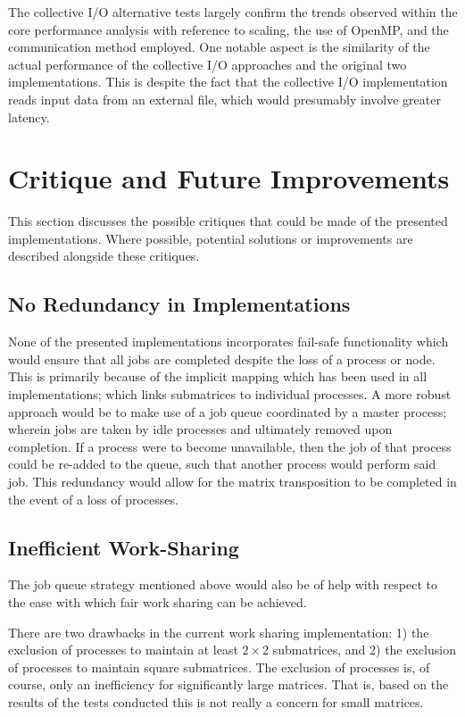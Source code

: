 \documentclass[journal,10pt,a4paper]{IEEEtran}
\begin{document}
The collective I/O alternative tests largely confirm the trends observed within the core performance analysis with reference to scaling, the use of OpenMP, and the communication method employed. One notable aspect is the similarity of the actual performance of the collective I/O approaches and the original two implementations. This is despite the fact that the collective I/O implementation reads input data from an external file, which would presumably involve greater latency.



\section{Critique and Future Improvements}
This section discusses the possible critiques that could be made of the presented implementations. Where possible, potential solutions or improvements are described alongside these critiques.

\subsection{No Redundancy in Implementations}

None of the presented implementations incorporates fail-safe functionality which would ensure that all jobs are completed despite the loss of a process or node. This is primarily because of the implicit mapping which has been used in all implementations; which links submatrices to individual processes. A more robust approach would be to make use of a job queue coordinated by a master process; wherein jobs are taken by idle processes and ultimately removed upon completion. If a process were to become unavailable, then the job of that process could be re-added to the queue, such that another process would perform said job. This redundancy would allow for the matrix transposition to be completed in the event of a loss of processes.

\subsection{Inefficient Work-Sharing}
The job queue strategy mentioned above would also be of help with respect to the ease with which fair work sharing can be achieved. 

There are two drawbacks in the current work sharing implementation: 1) the exclusion of processes to maintain at least $2\times2$ submatrices, and 2) the exclusion of processes to maintain square submatrices. The exclusion of processes is, of course, only an inefficiency for significantly large matrices. That is, based on the results of the tests conducted this is not really a concern for small matrices.
\end{document}
